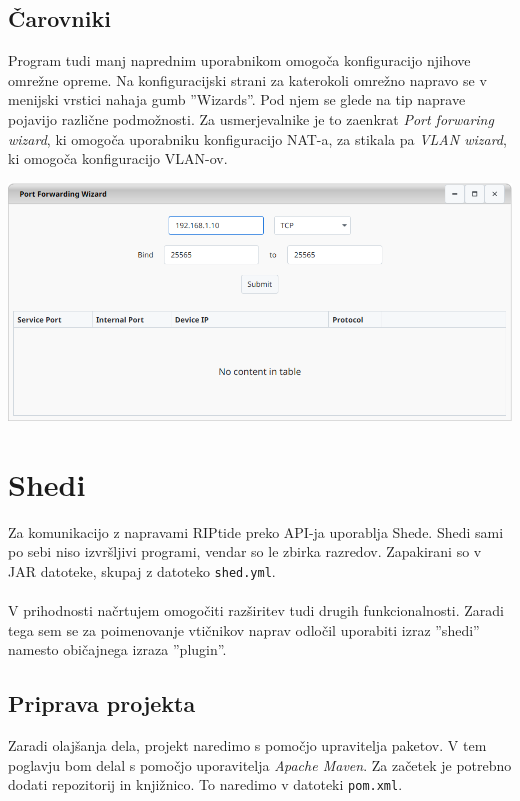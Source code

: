 \documentclass[12pt]{article}
\begin{document}
\subsection{Čarovniki}
Program tudi manj naprednim uporabnikom omogoča konfiguracijo njihove
omrežne opreme. Na konfiguracijski strani za katerokoli omrežno napravo
se v menijski vrstici nahaja gumb ''Wizards''. Pod njem se glede na tip
naprave pojavijo različne podmožnosti. Za usmerjevalnike je to zaenkrat
\textit{Port forwaring wizard}, ki omogoča uporabniku konfiguracijo NAT-a,
za stikala pa \textit{VLAN wizard}, ki omogoča konfiguracijo VLAN-ov.

\begin{center}
	\includegraphics[scale=0.56]{slike/pat-wizard.png}
\end{center}
\newpage

\section{Shedi}
Za komunikacijo z napravami RIPtide preko API-ja uporablja Shede. Shedi
sami po sebi niso izvršljivi programi, vendar so le zbirka razredov.
Zapakirani so v JAR datoteke, skupaj z datoteko \texttt{shed.yml}.
\\\\
V prihodnosti načrtujem omogočiti razširitev tudi drugih funkcionalnosti.
Zaradi tega sem se za poimenovanje vtičnikov naprav odločil uporabiti
izraz ''shedi'' namesto običajnega izraza ''plugin''.

\subsection{Priprava projekta}
Zaradi olajšanja dela, projekt naredimo s pomočjo upravitelja paketov. V
tem poglavju bom delal s pomočjo uporavitelja \textit{Apache Maven}. Za
začetek je potrebno dodati repozitorij in knjižnico. To naredimo v datoteki
\texttt{pom.xml}.
\end{document}
